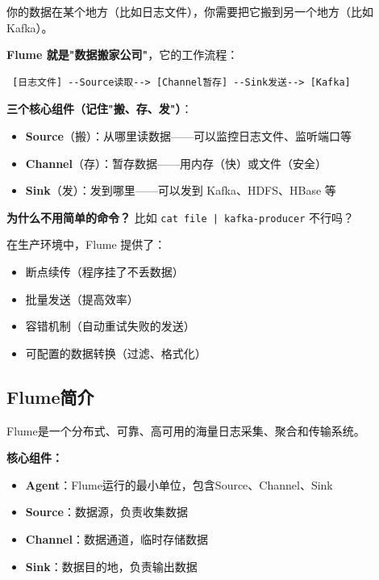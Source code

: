 \documentclass[12pt,a4paper]{article}
\begin{document}
\begin{theorybox}
你的数据在某个地方（比如日志文件），你需要把它搬到另一个地方（比如 Kafka）。

\textbf{Flume 就是"数据搬家公司"}，它的工作流程：
\begin{verbatim}
 [日志文件] --Source读取--> [Channel暂存] --Sink发送--> [Kafka]
\end{verbatim}

\textbf{三个核心组件（记住"搬、存、发"）}：
\begin{itemize}
    \item \textbf{Source}（搬）：从哪里读数据——可以监控日志文件、监听端口等
    \item \textbf{Channel}（存）：暂存数据——用内存（快）或文件（安全）
    \item \textbf{Sink}（发）：发到哪里——可以发到 Kafka、HDFS、HBase 等
\end{itemize}

\textbf{为什么不用简单的命令？} 比如 \texttt{cat file | kafka-producer} 不行吗？

在生产环境中，Flume 提供了：
\begin{itemize}
    \item 断点续传（程序挂了不丢数据）
    \item 批量发送（提高效率）
    \item 容错机制（自动重试失败的发送）
    \item 可配置的数据转换（过滤、格式化）
\end{itemize}
\end{theorybox}

\subsection{Flume简介}

\begin{theorybox}[Flume架构]
Flume是一个分布式、可靠、高可用的海量日志采集、聚合和传输系统。

\textbf{核心组件：}
\begin{itemize}
    \item \textbf{Agent}：Flume运行的最小单位，包含Source、Channel、Sink
    \item \textbf{Source}：数据源，负责收集数据
    \item \textbf{Channel}：数据通道，临时存储数据
    \item \textbf{Sink}：数据目的地，负责输出数据
\end{itemize}
\end{theorybox}
\end{document}
